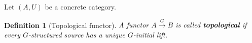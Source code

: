 \documentclass[12pt,a4paper]{article}
\newtheorem{definition}{Definition}[section] %
\DeclareMathOperator{\Frm}{Frm}
\DeclareMathOperator{\Top}{Top}
\DeclareMathOperator{\kSp}{kSp}
\def\t{\ensuremath\tilde}
\begin{document}
Let $(A, U)$ be a concrete category. 
\begin{definition}[Topological functor]
A functor $A \stackrel{G}{\to}B$ is called \textbf{topological} if every $G$-structured source has a unique $G$-initial lift. 
 \end{definition}
 
 

%
%
\end{document}

